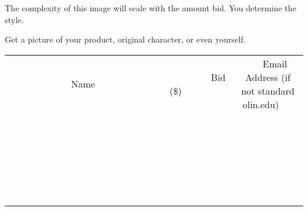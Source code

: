 \documentclass[11pt]{article}
\begin{document}
The complexity of this image will scale with the amount bid.
You determine the style.

Get a picture of your product, original character, or even yourself. \\[6ex]
\begin{tabular}{c c c}
~~~~~~~~~~~~~Name~~~~~~~~~~~~~ & ~~~~~~~~~Bid (\$)~~~~~~~~~ & ~~~Email Address (if not standard olin.edu)~~~ \\
 & & \\
\hline
 & & \\
\hline
 & & \\
\hline
 & & \\
\hline
 & & \\
\hline
 & & \\
\hline
 & & \\
\hline
 & & \\
\hline
 & & \\
\hline
 & & \\
\hline
 & & \\
\hline
 & & \\
\hline
 & & \\
\hline
 & & \\
\hline
 & & \\
\hline
 & & \\
\hline
 & & \\
\hline
 & & \\
\hline
 & & \\
\hline
 & & \\
\hline
 & & \\
\hline
 & & \\
\hline
 & & \\
\hline
 & & \\
\hline
 & & \\
\hline
 & & \\
\hline
\end{tabular}
\clearpage
\end{document}
